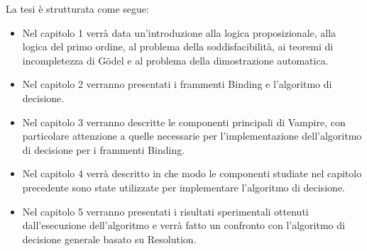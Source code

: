 \documentclass[./main.tex]{subfiles}
\begin{document}
% 

La tesi è strutturata come segue:
\begin{itemize}
    \item Nel capitolo 1 verrà data un'introduzione 
    alla logica proposizionale, alla logica del primo ordine, al problema della soddisfacibilità,
    ai teoremi di incompletezza di Gödel e al problema della dimostrazione automatica.
    \item Nel capitolo 2 verranno presentati i frammenti Binding e l'algoritmo di decisione.
    \item Nel capitolo 3 verranno descritte le componenti principali di Vampire, con particolare attenzione
    a quelle necessarie per l'implementazione dell'algoritmo di decisione per i frammenti Binding.
    \item Nel capitolo 4 verrà descritto in che modo le componenti studiate nel capitolo precedente
    sono state utilizzate per implementare l'algoritmo di decisione.
    \item Nel capitolo 5 verranno presentati i risultati sperimentali ottenuti dall'esecuzione dell'algoritmo
    e verrà fatto un confronto con l'algoritmo di decisione generale basato su Resolution.
\end{itemize}
\end{document}
